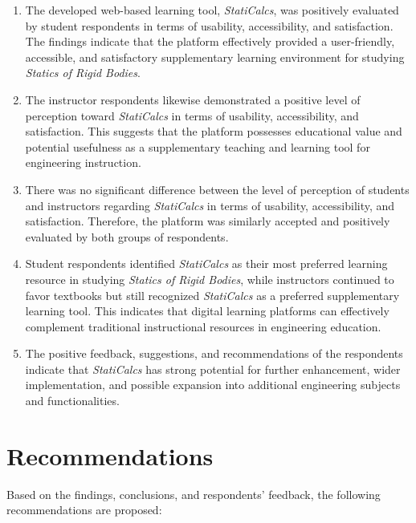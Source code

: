 \begin{enumerate}

\item The developed web-based learning tool, \textit{StatiCalcs}, was positively evaluated by student respondents in terms of usability, accessibility, and satisfaction. The findings indicate that the platform effectively provided a user-friendly, accessible, and satisfactory supplementary learning environment for studying \textit{Statics of Rigid Bodies}.

\item The instructor respondents likewise demonstrated a positive level of perception toward \textit{StatiCalcs} in terms of usability, accessibility, and satisfaction. This suggests that the platform possesses educational value and potential usefulness as a supplementary teaching and learning tool for engineering instruction.

\item There was no significant difference between the level of perception of students and instructors regarding \textit{StatiCalcs} in terms of usability, accessibility, and satisfaction. Therefore, the platform was similarly accepted and positively evaluated by both groups of respondents.

\item Student respondents identified \textit{StatiCalcs} as their most preferred learning resource in studying \textit{Statics of Rigid Bodies}, while instructors continued to favor textbooks but still recognized \textit{StatiCalcs} as a preferred supplementary learning tool. This indicates that digital learning platforms can effectively complement traditional instructional resources in engineering education.

\item The positive feedback, suggestions, and recommendations of the respondents indicate that \textit{StatiCalcs} has strong potential for further enhancement, wider implementation, and possible expansion into additional engineering subjects and functionalities.

\end{enumerate}

\section{Recommendations}\label{sec:5-recommendations}

Based on the findings, conclusions, and respondents’ feedback, the following recommendations are proposed:

